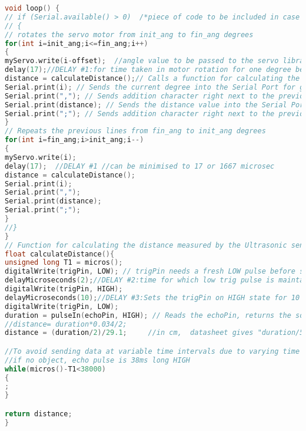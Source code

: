 \begin{mdframed}[backgroundcolor=light-gray, roundcorner=10pt,leftmargin=1, rightmargin=1, innerleftmargin=15, innertopmargin=15,innerbottommargin=15, outerlinewidth=1, linecolor=light-gray]
\begin{lstlisting}[caption={The Arduino Code},language = C]
void loop() {
// if (Serial.available() > 0)  /*piece of code to be included in case of serial communication with IoT board*/
// {
// rotates the servo motor from init_ang to fin_ang degrees
for(int i=init_ang;i<=fin_ang;i++)
{  
myServo.write(i-offset);  //angle value to be passed to the servo library object for writing into the motor
delay(17);//DELAY #1:for time taken in motor rotation for one degree before calculating distance
distance = calculateDistance();// Calls a function for calculating the distance measured by the Ultrasonic sensor for each degree
Serial.print(i); // Sends the current degree into the Serial Port for graphical representation
Serial.print(","); // Sends addition character right next to the previous value needed later in the Processing IDE for indexing
Serial.print(distance); // Sends the distance value into the Serial Port for the graph
Serial.print(";"); // Sends addition character right next to the previous value needed later in the Processing IDE for indexing
}
// Repeats the previous lines from fin_ang to init_ang degrees
for(int i=fin_ang;i>init_ang;i--)
{  
myServo.write(i);
delay(17);  //DELAY #1 //can be minimised to 17 or 1667 microsec
distance = calculateDistance();
Serial.print(i);
Serial.print(",");
Serial.print(distance);
Serial.print(";");
}
//}
}
// Function for calculating the distance measured by the Ultrasonic sensor
float calculateDistance(){ 
unsigned long T1 = micros();
digitalWrite(trigPin, LOW); // trigPin needs a fresh LOW pulse before sending a HIGH pulse that can be detected from echoPin
delayMicroseconds(2);//DELAY #2:time for which low trig pulse is maintained before making it high
digitalWrite(trigPin, HIGH); 
delayMicroseconds(10);//DELAY #3:Sets the trigPin on HIGH state for 10 micro seconds
digitalWrite(trigPin, LOW);
duration = pulseIn(echoPin, HIGH); // Reads the echoPin, returns the sound wave travel time in microseconds
//distance= duration*0.034/2;
distance = (duration/2)/29.1;     //in cm,  datasheet gives "duration/58" as the formula

//To avoid sending data at variable time intervals due to varying time duration taken between execution of above code inside this function depending on distance of obstacle
//if no object, echo pulse is 38ms long HIGH
while(micros()-T1<38000)
{
;
}

return distance;
}
\end{lstlisting}

\end{mdframed}
\clearpage

